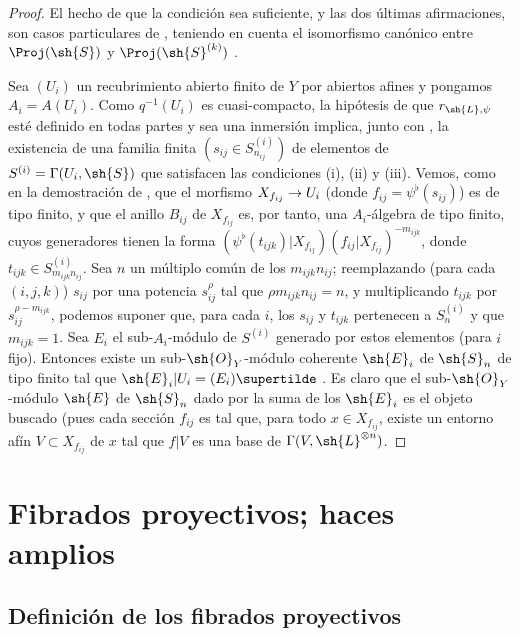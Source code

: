 \documentclass[oneside,10pt]{amsart}
\makeatletter
\newcommand{\ega@arrow}[2]{\mathchoice{#1}{#2}{#2}{#2}}
\renewcommand{\to}{\ega@arrow{\longrightarrow}{\rightarrow}}
\newcommand{\oldpage}[2][]{\marginnote{\normalfont\footnotesize\textbf{#1}~|~#2}\ignorespaces}
\let\EGAOriginalLabel\label
\renewcommand{\label}[1]{\phantomsection\EGAOriginalLabel{#1}}
\makeatother
\begin{document}
\begin{proof}
El hecho de que la condición sea suficiente, y las dos últimas afirmaciones, son casos particulares de , teniendo en cuenta el isomorfismo canónico entre $\Proj(\sh{S})$ y $\Proj(\sh{S}^{(k)})$ .

Sea $(U_i)$ un recubrimiento abierto finito de $Y$ por abiertos afines y pongamos $A_i=A(U_i)$.
Como $q^{-1}(U_i)$ es cuasi-compacto, la hipótesis de que $r_{\sh{L},\psi}$ esté definido en todas partes y sea una inmersión implica, junto con , la existencia de una familia finita $(s_{ij}\in S_{n_{ij}}^{(i)})$ de elementos de $S^{(i)}=\Gamma(U_i,\sh{S})$ que satisfacen las condiciones (i), (ii) y (iii).
Vemos, como en la demostración de , que el morfismo $X_{f_{ij}}\to U_i$ (donde $f_{ij}=\psi^\flat(s_{ij})$) es de tipo finito, y que el anillo $B_{ij}$ de $X_{f_{ij}}$ es, por tanto, una $A_i$-álgebra de tipo finito, cuyos generadores tienen la forma $(\psi^\flat(t_{ijk})|X_{f_{ij}})(f_{ij}|X_{f_{ij}})^{-m_{ijk}}$, donde $t_{ijk}\in S_{m_{ijk}n_{ij}}^{(i)}$.
Sea $n$ un múltiplo común de los $m_{ijk}n_{ij}$;
reemplazando (para cada $(i,j,k)$) $s_{ij}$ por una potencia $s_{ij}^\rho$ tal que $\rho m_{ijk}n_{ij}=n$, y multiplicando $t_{ijk}$ por $s_{ij}^{\rho-m_{ijk}}$, podemos suponer que, para cada $i$, los $s_{ij}$ y $t_{ijk}$ pertenecen a $S_n^{(i)}$ y que $m_{ijk}=1$.
Sea $E_i$ el sub-$A_i$-módulo de $S^{(i)}$ generado por estos elementos (para $i$ fijo).
Entonces existe un sub-$\sh{O}_Y$-módulo coherente $\sh{E}_i$ de $\sh{S}_n$ de tipo finito tal que $\sh{E}_i|U_i=(E_i)\supertilde$ .
\oldpage[II]{71}
Es claro que el sub-$\sh{O}_Y$-módulo $\sh{E}$ de $\sh{S}_n$ dado por la suma de los $\sh{E}_i$ es el objeto buscado (pues cada sección $f_{ij}$ es tal que, para todo $x\in X_{f_{ij}}$, existe un entorno afín $V\subset X_{f_{ij}}$ de $x$ tal que $f|V$ es una base de $\Gamma(V,\sh{L}^{\otimes n})$.
\end{proof}

\section{Fibrados proyectivos; haces amplios}
\label{section:II.4}

\subsection{Definición de los fibrados proyectivos}
\label{subsection:II.4.1}
\end{document}
